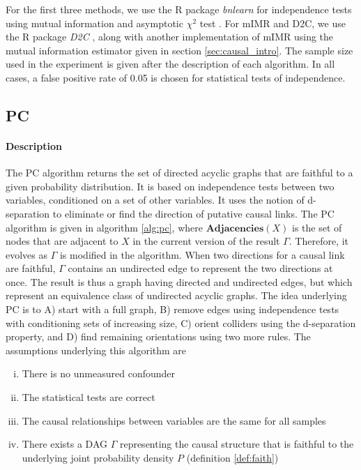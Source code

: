 For the first three methods, we use the R package \emph{bnlearn}
\parencite{scutari2009learning} for independence tests using mutual information
and asymptotic $\chi^2$ test \parencite{good2013permutation}. For mIMR and D2C,
we use the R package \emph{D2C} \parencite{bontempi2015dependency}, along with
another implementation of mIMR using the mutual information estimator given in
section \ref{sec:causal_intro}. The sample size used in the experiment is given
after the description of each algorithm. In all cases, a false positive rate of
0.05 is chosen for statistical tests of independence.

\subsection{PC}

\paragraph{Description} The PC algorithm \parencite{spirtes1991algorithm}
returns the set of directed acyclic graphs that are faithful to a given
probability distribution. It is based on independence tests between two
variables, conditioned on a set of other variables. It uses the notion of
d-separation to eliminate or find the direction of putative causal links. The PC
algorithm is given in algorithm \ref{alg:pc}, where $\textbf{Adjacencies}(X)$ is
the set of nodes that are adjacent to $X$ in the current version of the result
$\Gamma$. Therefore, it evolves as $\Gamma$ is modified in the algorithm. When
two directions for a causal link are faithful, $\Gamma$ contains an undirected
edge to represent the two directions at once. The result is thus a graph having
directed and undirected edges, but which represent an equivalence class of
undirected acyclic graphs. The idea underlying PC is to A) start with a full
graph, B) remove edges using independence tests with conditioning sets of
increasing size, C) orient colliders using the d-separation property, and D)
find remaining orientations using two more rules. The assumptions underlying
this algorithm are

\begin{enumerate}[(i)]
    \item There is no unmeasured confounder
    \item The statistical tests are correct
    \item The causal relationships between variables are the same for all samples
    \item There exists a DAG $\Gamma$ representing the causal structure that is
    faithful to the underlying joint probability density $P$ (definition
    \ref{def:faith})
\end{enumerate}

